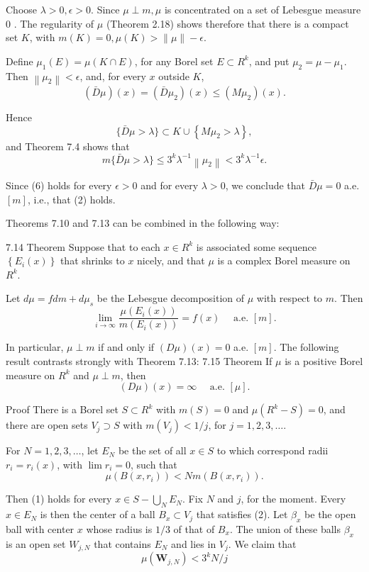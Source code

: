 Choose $\lambda>0, \epsilon>0$. Since $\mu \perp m, \mu$ is concentrated on a set of Lebesgue measure 0 . The regularity of $\mu$ (Theorem 2.18) shows therefore that there is a compact set $K$, with $m(K)=0, \mu(K)>\|\mu\|-\epsilon$.

Define $\mu_1(E)=\mu(K \cap E)$, for any Borel set $E \subset R^k$, and put $\mu_2=\mu-\mu_1$. Then $\left\|\mu_2\right\|<\epsilon$, and, for every $x$ outside $K$,
$$
(\bar{D} \mu)(x)=\left(\bar{D} \mu_2\right)(x) \leq\left(M \mu_2\right)(x) .
$$

Hence
$$
\{\bar{D} \mu>\lambda\} \subset K \cup\left\{M \mu_2>\lambda\right\},
$$
and Theorem 7.4 shows that
$$
m\{\bar{D} \mu>\lambda\} \leq 3^k \lambda^{-1}\left\|\mu_2\right\|<3^k \lambda^{-1} \epsilon .
$$

Since (6) holds for every $\epsilon>0$ and for every $\lambda>0$, we conclude that $\bar{D} \mu=0$ a.e. $[m]$, i.e., that (2) holds.

Theorems 7.10 and 7.13 can be combined in the following way:


7.14 Theorem Suppose that to each $x \in R^k$ is associated some sequence $\left\{E_i(x)\right\}$ that shrinks to $x$ nicely, and that $\mu$ is a complex Borel measure on $R^k$.

Let $d \mu=f d m+d \mu_s$ be the Lebesgue decomposition of $\mu$ with respect to $m$. Then
$$
\lim _{i \rightarrow \infty} \frac{\mu\left(E_i(x)\right)}{m\left(E_i(x)\right)}=f(x) \quad \text { a.e. }[m] .
$$

In particular, $\mu \perp m$ if and only if $(D \mu)(x)=0$ a.e. $[m]$.
The following result contrasts strongly with Theorem 7.13:
7.15 Theorem If $\mu$ is a positive Borel measure on $R^k$ and $\mu \perp m$, then
$$
(D \mu)(x)=\infty \quad \text { a.e. }[\mu] .
$$

Proof There is a Borel set $S \subset R^k$ with $m(S)=0$ and $\mu\left(R^k-S\right)=0$, and there are open sets $V_j \supset S$ with $m\left(V_j\right)<1 / j$, for $j=1,2,3, \ldots$.

For $N=1,2,3, \ldots$, let $E_N$ be the set of all $x \in S$ to which correspond radii $r_i=r_i(x)$, with $\lim r_i=0$, such that
$$
\mu\left(B\left(x, r_i\right)\right)<N m\left(B\left(x, r_i\right)\right) .
$$

Then (1) holds for every $x \in S-\bigcup_N E_N$.
Fix $N$ and $j$, for the moment. Every $x \in E_N$ is then the center of a ball $B_x \subset V_j$ that satisfies (2). Let $\beta_x$ be the open ball with center $x$ whose radius is $1 / 3$ of that of $B_x$. The union of these balls $\beta_x$ is an open set $W_{j, N}$ that contains $E_N$ and lies in $V_j$. We claim that
$$
\mu\left(\boldsymbol{W}_{j, N}\right)<3^k N / j
$$

